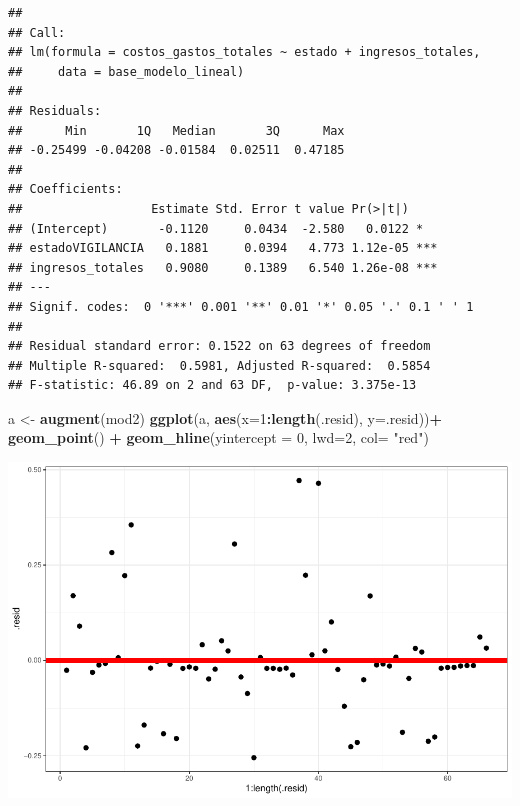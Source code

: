 \documentclass[
  11pt,
  a4paper,
]{book}
\newenvironment{Shaded}{\begin{snugshade}}{\end{snugshade}}
\newcommand{\DataTypeTok}[1]{\textcolor[rgb]{0.13,0.29,0.53}{#1}}
\newcommand{\DecValTok}[1]{\textcolor[rgb]{0.00,0.00,0.81}{#1}}
\newcommand{\KeywordTok}[1]{\textcolor[rgb]{0.13,0.29,0.53}{\textbf{#1}}}
\newcommand{\NormalTok}[1]{#1}
\newcommand{\OperatorTok}[1]{\textcolor[rgb]{0.81,0.36,0.00}{\textbf{#1}}}
\newcommand{\StringTok}[1]{\textcolor[rgb]{0.31,0.60,0.02}{#1}}
\begin{document}
\begin{verbatim}
## 
## Call:
## lm(formula = costos_gastos_totales ~ estado + ingresos_totales, 
##     data = base_modelo_lineal)
## 
## Residuals:
##      Min       1Q   Median       3Q      Max 
## -0.25499 -0.04208 -0.01584  0.02511  0.47185 
## 
## Coefficients:
##                  Estimate Std. Error t value Pr(>|t|)    
## (Intercept)       -0.1120     0.0434  -2.580   0.0122 *  
## estadoVIGILANCIA   0.1881     0.0394   4.773 1.12e-05 ***
## ingresos_totales   0.9080     0.1389   6.540 1.26e-08 ***
## ---
## Signif. codes:  0 '***' 0.001 '**' 0.01 '*' 0.05 '.' 0.1 ' ' 1
## 
## Residual standard error: 0.1522 on 63 degrees of freedom
## Multiple R-squared:  0.5981, Adjusted R-squared:  0.5854 
## F-statistic: 46.89 on 2 and 63 DF,  p-value: 3.375e-13
\end{verbatim}

\begin{Shaded}
\begin{Highlighting}[]
\NormalTok{a <-}\StringTok{ }\KeywordTok{augment}\NormalTok{(mod2)}
\KeywordTok{ggplot}\NormalTok{(a, }\KeywordTok{aes}\NormalTok{(}\DataTypeTok{x=}\DecValTok{1}\OperatorTok{:}\KeywordTok{length}\NormalTok{(.resid), }\DataTypeTok{y=}\NormalTok{.resid))}\OperatorTok{+}
\StringTok{  }\KeywordTok{geom_point}\NormalTok{() }\OperatorTok{+}\StringTok{ }
\StringTok{  }\KeywordTok{geom_hline}\NormalTok{(}\DataTypeTok{yintercept =} \DecValTok{0}\NormalTok{, }\DataTypeTok{lwd=}\DecValTok{2}\NormalTok{, }\DataTypeTok{col=} \StringTok{"red"}\NormalTok{)}
\end{Highlighting}
\end{Shaded}

\includegraphics{index_files/figure-latex/unnamed-chunk-20-1.pdf}
\end{document}
